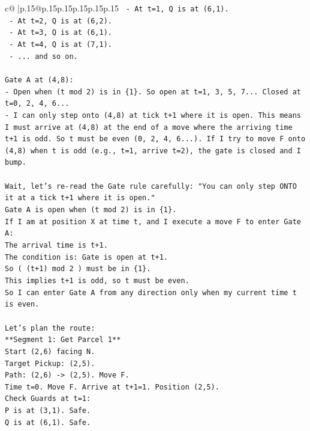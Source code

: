 \documentclass{article}
\begin{document}
{\begin{supertabular}{c@{$\;$}|p{.15\linewidth}@{}p{.15\linewidth}p{.15\linewidth}p{.15\linewidth}p{.15\linewidth}p{.15\linewidth}}
{{{\texttt{  {-} At t=1, Q is at (6,1).} \\
\texttt{  {-} At t=2, Q is at (6,2).} \\
\texttt{  {-} At t=3, Q is at (6,1).} \\
\texttt{  {-} At t=4, Q is at (7,1).} \\
\texttt{  {-} ... and so on.} \\
\\ 
\texttt{Gate A at (4,8):} \\
\texttt{{-} Open when (t mod 2) is in \{1\}. So open at t=1, 3, 5, 7... Closed at t=0, 2, 4, 6...} \\
\texttt{{-} I can only step onto (4,8) at tick t+1 where it is open. This means I must arrive at (4,8) at the end of a move where the arriving time t+1 is odd. So t must be even (0, 2, 4, 6...). If I try to move F onto (4,8) when t is odd (e.g., t=1, arrive t=2), the gate is closed and I bump.} \\
\\ 
\texttt{Wait, let's re{-}read the Gate rule carefully: "You can only step ONTO it at a tick t+1 where it is open."} \\
\texttt{Gate A is open when (t mod 2) is in \{1\}.} \\
\texttt{If I am at position X at time t, and I execute a move F to enter Gate A:} \\
\texttt{The arrival time is t+1.} \\
\texttt{The condition is: Gate is open at t+1.} \\
\texttt{So ( (t+1) mod 2 ) must be in \{1\}.} \\
\texttt{This implies t+1 is odd, so t must be even.} \\
\texttt{So I can enter Gate A from any direction only when my current time t is even.} \\
\\ 
\texttt{Let's plan the route:} \\
\texttt{**Segment 1: Get Parcel 1**} \\
\texttt{Start (2,6) facing N.} \\
\texttt{Target Pickup: (2,5).} \\
\texttt{Path: (2,6) {-}> (2,5). Move F.} \\
\texttt{Time t=0. Move F. Arrive at t+1=1. Position (2,5).} \\
\texttt{Check Guards at t=1:} \\
\texttt{P is at (3,1). Safe.} \\
\texttt{Q is at (6,1). Safe.} \\
}}}
\end{supertabular}}
\end{document}
